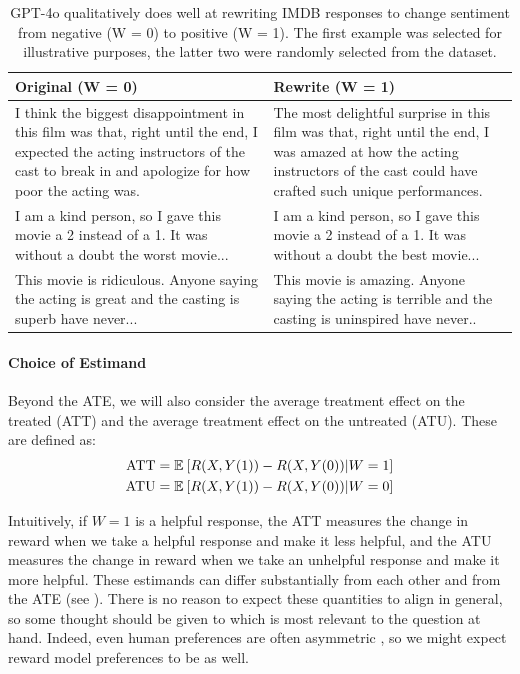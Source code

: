 \documentclass{article}
\begin{document}
\begin{table}[t]
  \centering
  \small
  \renewcommand{\arraystretch}{1.5}
  \begin{tabular}{|p{6cm}|p{6cm}|}
  \hline
  \textbf{Original (W = 0)} & \textbf{Rewrite (W = 1)} \\
  \hline
  I think the biggest disappointment in this film was that, right until the end, I expected the acting instructors of the cast to break in and apologize for how poor the acting was. & The most delightful surprise in this film was that, right until the end, I was amazed at how the acting instructors of the cast could have crafted such unique performances. \\
  \hline
  I am a kind person, so I
  gave this movie a 2 instead of a 1. It was without a doubt the worst
  movie... & I am a kind person, so
  I gave this movie a 2
  instead of a 1. It was
  without a doubt the best
  movie... \\
  \hline
  This movie is ridiculous.
  Anyone saying the acting is great and the casting is superb have never... & This movie is amazing. Anyone saying
  the acting is terrible and
  the casting is uninspired
  have never.. \\
  \hline
  \end{tabular}
  \caption{GPT-4o qualitatively does well at rewriting IMDB responses to change sentiment from negative (W = 0) to positive (W = 1). The first example was selected for illustrative purposes, the latter two were randomly selected from the dataset.}
  \label{tab:rewrites}
\end{table}

\paragraph{Choice of Estimand}
Beyond the ATE, we will also consider the average treatment effect on the treated (ATT) and the average treatment effect on the untreated (ATU). These are defined as:
\begin{align*}
  \text{ATT} &= \mathbb{E}_{}\left[R(X, Y(1)) - R(X, Y(0))|W=1\right] \\
  \text{ATU} &= \mathbb{E}_{}\left[R(X, Y(1)) - R(X, Y(0))|W=0\right]
\end{align*}

Intuitively, if $W=1$ is a helpful response, the ATT measures the change in reward when we take a helpful response and make it less helpful, and the ATU measures the change in reward when we take an unhelpful response and make it more helpful.
These estimands can differ substantially from each other and from the ATE (see ).
There is no reason to expect these quantities to align in general, so some thought should be given to which is most relevant to the question at hand. Indeed, even human preferences are often asymmetric \citep{kahneman2013prospect}, so we might expect reward model preferences to be as well.
  
\end{document}
